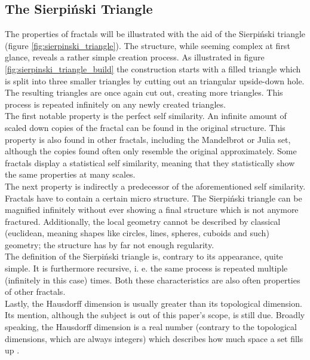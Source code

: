 \documentclass[10pt,a4paper,titlepage]{article}
\begin{document}
	\subsection{The Sierpiński Triangle}
	The properties of fractals will be illustrated with the aid of the Sierpiński triangle (figure \ref{fig:sierpinski_triangle}). The structure, while seeming complex at first glance, reveals a rather simple creation process. As illustrated in figure \ref{fig:sierpinski_triangle_build} the construction starts with a filled triangle which is split into three smaller triangles by cutting out an triangular upside-down hole. The resulting triangles are once again cut out, creating more triangles. This process is repeated infinitely on any newly created triangles. \\
	The first notable property is the perfect self similarity. An infinite amount of scaled down copies of the fractal can be found in the original structure. This property is also found in other fractals, including the Mandelbrot or Julia set, although the copies found often only resemble the original approximately. Some fractals display a statistical self similarity, meaning that they statistically show the same properties at many scales.\\
	The next property is indirectly a predecessor of the aforementioned self similarity. Fractals have to contain a certain micro structure. The Sierpiński triangle can be magnified infinitely without ever showing a final structure which is not anymore fractured. Additionally, the local geometry cannot be described by classical (euclidean, meaning shapes like circles, lines, spheres, cuboids and such) geometry; the structure has by far not enough regularity.\\
	The definition of the Sierpiński triangle is, contrary to its appearance, quite simple. It is furthermore recursive, i. e. the same process is repeated multiple (infinitely in this case) times. Both these characteristics are also often properties of other fractals.\\
	Lastly, the Hausdorff dimension is usually greater than its topological dimension. Its mention, although the subject is out of this paper's scope, is still due. Broadly speaking, the Hausdorff dimension is a real number (contrary to the topological dimensions, which are always integers) which describes how much space a set fills up \cite[Einleitung]{FalconerKennethJ1993FG:m}.
	
\end{document}
